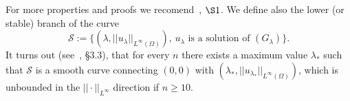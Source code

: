 For more properties and proofs we recomend~\cite{stable-solutions-elliptic},
$\S 1$. We define also the lower (or stable) branch of the curve
\[
    \mathcal S:=\{(\lambda,||u_\lambda||_{L^\infty(\Omega)}),\, u_\lambda\mbox{ is a
    solution of }(G_\lambda)\}.
\]
It turns out (see~\cite{stable-solutions-elliptic}, \S 3.3), that for every $n$
there exists a maximum value $\lambda_\ast$ such that $\mathcal{S}$
is a smooth curve connecting $(0,0)$ with $(\lambda_\ast,
||u_{\lambda_\ast}||_{L^\infty(\Omega)})$, which is unbounded in the $||\cdot
||_{L^\infty}$ direction if $n\geq 10$.

